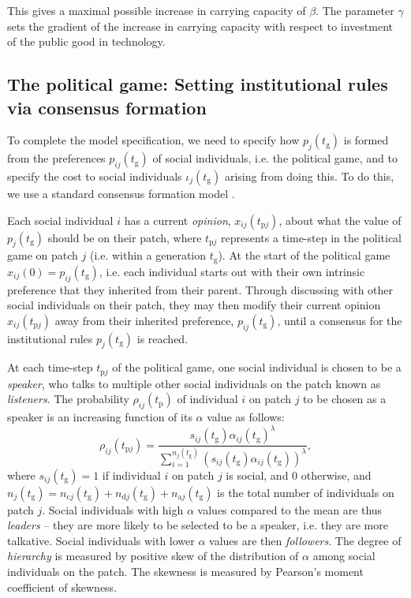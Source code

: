 \documentclass{rstb}
\begin{document}
\begin{linenumbers}
 This gives a maximal possible increase in carrying capacity of $\beta$. The parameter $\gamma$ sets the gradient of the increase in carrying capacity with respect to investment of the public good in technology.

\subsection{The political game: Setting institutional rules via consensus formation} 
To complete the model specification, we need to specify how $p_j(t_\mathrm{g})$ is formed from the preferences $p_{ij}(t_\mathrm{g})$ of social individuals, i.e. the political game, and to specify the cost to social individuals $\iota_j(t_\mathrm{g})$ arising from doing this. To do this, we use a standard consensus formation model \cite{Gavrilets:2016:a,Perret:2020:a,Perret:2022:a}.

Each social individual $i$ has a current \emph{opinion}, $x_{ij}(t_{\mathrm{p}j})$, about what the value of $p_j(t_\mathrm{g})$ should be on their patch, where $t_{\mathrm{p}j}$ represents a time-step in the political game on patch $j$ (i.e. within a generation $t_\mathrm{g}$). At the start of the political game $x_{ij}(0)=p_{ij}(t_\mathrm{g})$, i.e. each individual starts out with their own intrinsic preference that they inherited from their parent. Through discussing with other social individuals on their patch, they may then modify their current opinion $x_{ij}(t_{\mathrm{p}j})$ away from their inherited preference, $p_{ij}(t_\mathrm{g})$, until a consensus for the institutional rules $p_j(t_\mathrm{g})$ is reached.

At each time-step $t_{\mathrm{p}j}$ of the political game, one social individual is chosen to be a \emph{speaker}, who talks to multiple other social individuals on the patch known as \emph{listeners}. The probability $\rho_{ij}(t_\mathrm{p})$ of individual $i$ on patch $j$ to be chosen as a speaker is an increasing function of its $\alpha$ value as follows:
\begin{equation}
\rho_{ij}(t_{\mathrm{p}j})=\frac{s_{ij}(t_\mathrm{g})\alpha_{ij}(t_\mathrm{g})^\lambda}{{\sum_{i=1}^{n_j(t_\mathrm{g})}}\left(s_{ij}(t_\mathrm{g})\alpha_{ij}\left(t_\mathrm{g}\right)\right)^\lambda},
\label{eqnProbSpeaker}
\end{equation}
where $s_{ij}(t_\mathrm{g})=1$ if individual $i$ on patch $j$ is social, and 0 otherwise, and $n_{j}(t_\mathrm{g})=n_{\mathrm{c}j}(t_\mathrm{g})+n_{\mathrm{d}j}(t_\mathrm{g})+n_{\mathrm{a}j}(t_\mathrm{g})$ is the total number of individuals on patch $j$. Social individuals with high $\alpha$ values compared to the mean are thus \emph{leaders} -- they are more likely to be selected to be a speaker, i.e. they are more talkative. Social individuals with lower $\alpha$ values are then \emph{followers}. The degree of \emph{hierarchy} is measured by positive skew of the distribution of $\alpha$ among social individuals on the patch. The skewness is measured by Pearson's moment coefficient of skewness.


\end{linenumbers}
\end{document}
